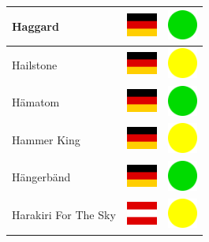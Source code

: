\documentclass[12pt, a4paper, twoside]{report}
\begin{document}
\begin{center}
\begin{longtable}{|p{5cm}|p{2cm}|p{2cm}|}
 Haggard                                                    & \includegraphics[width=1cm]{../img/flags/de} &   \includegraphics[width=1cm]{../likes/y} \\ \hline
 Hailstone                                                  & \includegraphics[width=1cm]{../img/flags/de} &   \includegraphics[width=1cm]{../likes/m} \\ \hline
 Hämatom                                                    & \includegraphics[width=1cm]{../img/flags/de} &   \includegraphics[width=1cm]{../likes/y} \\ \hline
 Hammer King                                                & \includegraphics[width=1cm]{../img/flags/de} &   \includegraphics[width=1cm]{../likes/m} \\ \hline
 Hängerbänd                                                 & \includegraphics[width=1cm]{../img/flags/de} &   \includegraphics[width=1cm]{../likes/y} \\ \hline
 Harakiri For The Sky                                       & \includegraphics[width=1cm]{../img/flags/at} &   \includegraphics[width=1cm]{../likes/m} \\ \hline

\end{longtable}
\end{center}
\end{document}
